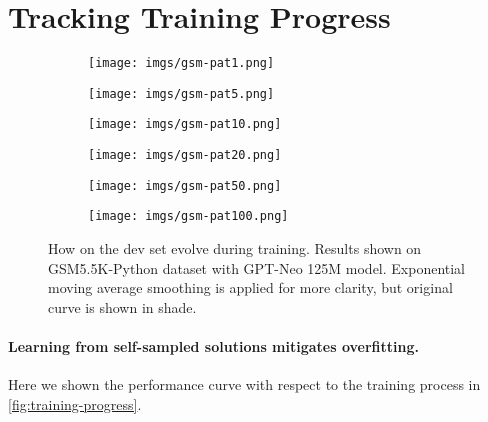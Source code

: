 \section{Tracking Training Progress}
\label{sec:training-progress}
\begin{figure}[ht]
     \centering
     \begin{subfigure}[b]{0.49\textwidth}
         \centering
         \texttt{[image: imgs/gsm-pat1.png]}
     \end{subfigure}
     \hfill
     \begin{subfigure}[b]{0.49\textwidth}
         \centering
         \texttt{[image: imgs/gsm-pat5.png]}
     \end{subfigure}
     \hfill
     \begin{subfigure}[b]{0.49\textwidth}
         \centering
         \texttt{[image: imgs/gsm-pat10.png]}
     \end{subfigure}
     \hfill
     \begin{subfigure}[b]{0.49\textwidth}
         \centering
         \texttt{[image: imgs/gsm-pat20.png]}
     \end{subfigure}
     \hfill
     \begin{subfigure}[b]{0.49\textwidth}
         \centering
         \texttt{[image: imgs/gsm-pat50.png]}
     \end{subfigure}
     \hfill
     \begin{subfigure}[b]{0.49\textwidth}
         \centering
         \texttt{[image: imgs/gsm-pat100.png]}
     \end{subfigure}
        \caption{How \patk on the dev set evolve during training. Results shown on GSM5.5K-Python dataset with GPT-Neo 125M model. Exponential moving average smoothing is applied for more clarity, but original curve is shown in shade.}
        \label{fig:training-progress}
\end{figure} \paragraph{Learning from self-sampled solutions mitigates overfitting.}
Here we shown the \patk performance curve with respect to the training process in \autoref{fig:training-progress}. 
